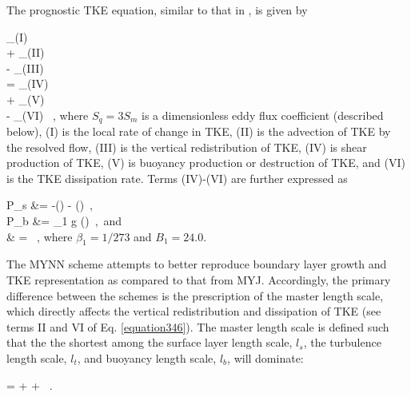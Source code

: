 The prognostic TKE equation, similar to that in  \citet{MY82}, is given by

  
\be
{}_{(I)} \\
+ _{(II)}\\
- _{(III)} \\
= _{(IV)} \\
+ _{(V)}\\
- _{(VI)} \mbox{ ,}
\label{equation346}
\ee
\noindent
 where $S_q = 3 S_m$ is a dimensionless eddy flux coefficient (described below), (I) is the local rate of change in TKE, (II) is the advection of TKE by the resolved flow, (III) is the vertical redistribution of TKE, (IV) is shear production of TKE, (V) is buoyancy production or destruction of TKE, and (VI) is the TKE dissipation rate. Terms (IV)-(VI) are further expressed as

\bse \label{equation347}
\bal
P_s &= -\left(\right) - \left(\right)\mbox{ ,} \label{equation347a}\\
P_b &= \beta_1 g \left(\right)\mbox{ , and} \label{equation347b} \\
\epsilon & =  \label{equation347c} \mbox{ ,}
\eal
\ese
\noindent
 where $\beta_1 = 1/273$ and $B_1 = 24.0$.

The MYNN scheme attempts to better reproduce boundary layer growth and TKE representation as compared to that from MYJ. Accordingly, the primary difference between the schemes is the prescription of the master length scale, which directly affects the vertical redistribution and dissipation of TKE (see terms II and VI of Eq. \autoref{equation346}). The master length scale is defined such that the the shortest among the surface layer length scale, $l_s$, the turbulence length scale, $l_t$, and buoyancy length scale, $l_b$, will dominate:

\be
{} =  +  +  \mbox{ .}\label{equation348}
\ee


